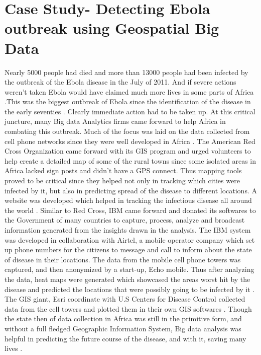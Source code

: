 \section{Case Study- Detecting Ebola outbreak using Geospatial Big Data}
Nearly 5000 people had died and more than 13000 people had been infected by the outbreak of the Ebola disease in the July of 2011. And if severe actions weren't taken Ebola would have claimed much more lives in some parts of Africa \cite{link11}.This was the biggest outbreak of Ebola since the identification of the disease in the early seventies \cite{link11}. Clearly immediate action had to be taken up. At this critical juncture, many Big data Analytics firms came forward to help Africa in combating this outbreak. Much of the focus was laid on the data collected from cell phone networks since they were well developed in Africa \cite{link12}. The American Red Cross Organization came forward with its GIS program and urged volunteers to help create a detailed map of some of the rural towns since some isolated areas in Africa lacked sign posts and didn't have a GPS connect. Thus mapping tools proved to be critical since they helped not only in tracking which cities were infected by it, but also in predicting spread of the disease to different locations. A website was developed which helped in tracking the infectious disease all around the world \cite{link11}.
Similar to Red Cross, IBM came forward and donated its softwares to the Government of many countries to capture, process, analyze and broadcast information generated from the insights drawn in the analysis. The IBM system was developed in collaboration with Airtel, a mobile operator company which set up phone numbers for the citizens to message and call to inform about the state of disease in their locations. The data from the mobile cell phone towers was captured, and then anonymized by a start-up, Echo mobile. Thus after analyzing the data, heat maps were generated which showcased the areas worst hit by the disease and predicted the locations that were possibly going to be infected by it \cite{link11}.
The GIS giant, Esri coordinate with U.S Centers for Disease Control collected data from the cell towers and plotted them in their own GIS softwares \cite{link11}.
Though the state then of data collection in Africa was still in the primitive form, and without a full fledged Geographic Information System, Big data analysis was helpful in predicting the future course of the disease, and with it, saving many lives \cite{link12}.




